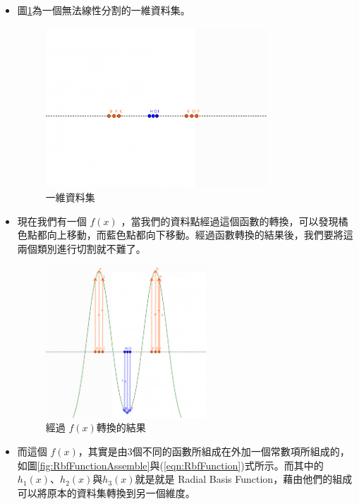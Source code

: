 \begin{itemize}
	\item

	      圖\ref{fig:RbfIntroductionNotTransfer}為一個無法線性分割的一維資料集。



	      \begin{figure}[h]
		      \centering
		      \includegraphics[height=6cm]{./pic/vM4xT9rm.png}
		      \caption{一維資料集}
		      \label{fig:RbfIntroductionNotTransfer}
	      \end{figure}

	\item
	      現在我們有一個 \(f(x)\) ，當我們的資料點經過這個函數的轉換，可以發現橘色點都向上移動，而藍色點都向下移動。經過函數轉換的結果後，我們要將這兩個類別進行切割就不難了。

	      \begin{figure}[h]
		      \centering
		      \includegraphics[width=6cm]{./pic/7VM3Lid5.png}
		      \caption{經過 \(f(x)\)轉換的結果 }
		      \label{fig:RbfWithFunction}
	      \end{figure}


	\item
	      而這個 \(f(x)\)，其實是由3個不同的函數所組成在外加一個常數項所組成的，如圖\ref{fig:RbfFunctionAssemble}與(\ref{eqn:RbfFunction})式所示。而其中的 \(h_1(x)\)、\(h_2(x)\)與\(h_3(x)\)就是就是 Radial Basis Function，藉由他們的組成可以將原本的資料集轉換到另一個維度。


\end{itemize}
